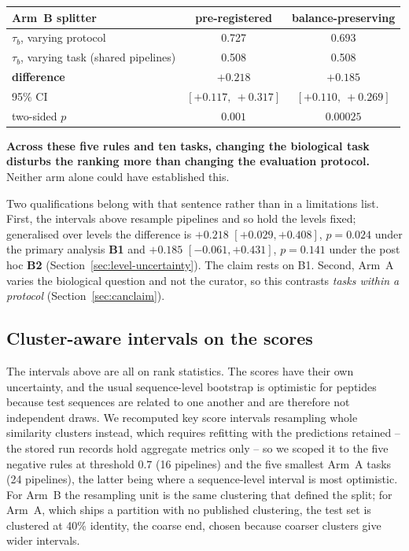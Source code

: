 \documentclass[11pt,a4paper]{article}
\begin{document}
\begin{center}\small
\begin{tabular}{lcc}
\toprule
Arm~B splitter & pre-registered & balance-preserving \\
\midrule
$\tau_b$, varying protocol                & 0.727 & 0.693 \\
$\tau_b$, varying task (shared pipelines) & 0.508 & 0.508 \\
\textbf{difference}                       & $\mathbf{+0.218}$ & $\mathbf{+0.185}$ \\
95\% CI                                   & $[+0.117,\ +0.317]$ & $[+0.110,\ +0.269]$ \\
two-sided $p$                             & $0.001$ & $0.00025$ \\
\bottomrule
\end{tabular}
\end{center}

\noindent\textbf{Across these five rules and ten tasks, changing the biological task
disturbs the ranking more than changing the evaluation protocol.} Neither arm alone could
have established this.

Two qualifications belong with that sentence rather than in a limitations list. First, the
intervals above resample pipelines and so hold the levels fixed; generalised over levels the
difference is ${+}0.218$ $[{+}0.029, {+}0.408]$, $p = 0.024$ under the primary analysis
\textbf{B1} and ${+}0.185$ $[{-}0.061, {+}0.431]$, $p = 0.141$ under the post hoc
\textbf{B2} (Section~\ref{sec:level-uncertainty}). The claim rests on B1. Second, Arm~A
varies the biological question and not the curator, so this contrasts \emph{tasks within a
protocol} (Section~\ref{sec:canclaim}).

\subsection{Cluster-aware intervals on the scores}
\label{sec:cluster-ci}

The intervals above are all on rank statistics. The scores have their own
uncertainty, and the usual sequence-level bootstrap is optimistic for peptides because test
sequences are related to one another and are therefore not independent draws. We recomputed
key score intervals resampling whole similarity clusters instead, which requires refitting
with the predictions retained -- the stored run records hold aggregate metrics only -- so we
scoped it to the five negative rules at threshold $0.7$ (16 pipelines) and the five smallest
Arm~A tasks (24 pipelines), the latter being where a sequence-level interval is most
optimistic. For Arm~B the resampling unit is the same clustering that defined the split; for
Arm~A, which ships a partition with no published clustering, the test set is clustered at
40\% identity, the coarse end, chosen because coarser clusters give wider intervals.
\end{document}

